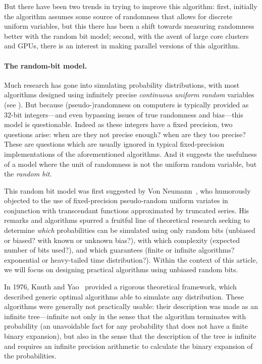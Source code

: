 \documentclass[letter,11pt,en]{quick-document}
\begin{document}
But there have been two trends in trying to improve this algorithm: first,
initially the algorithm assumes some source of randomness that allows for
discrete uniform variables, but this there has been a shift towards
measuring randomness better with the random bit model; second, with the
avent of large core clusters and GPUs, there is an interest in making
parallel versions of this algorithm.

\paragraph{The random-bit model.}

Much research has gone into simulating probability distributions, with
most algorithms designed using infinitely precise \emph{continuous uniform
  random} variables (see \cite[II.3.7]{Devroye86}). But because
(pseudo-)randomness on computers is typically provided as 32-bit
integers---and even bypassing issues of true randomness and bias---this
model is questionable. Indeed as these integers have a fixed precision,
two questions arise: when are they not precise enough? when are they too
precise? These are questions which are usually ignored in typical
fixed-precision implementations of the aforementioned algorithms. And it
suggests the usefulness of a model where the unit of randomness is not the
uniform random variable, but the \emph{random bit}.

This random bit model was first suggested by Von Neumann~\cite{Neumann51},
who humorously objected to the use of fixed-precision pseudo-random
uniform variates in conjunction with transcendant functions approximated
by truncated series. His remarks and algorithms spurred a fruitful line of
theoretical research seeking to determine \emph{which} probabilities can
be simulated using only random bits (unbiased or biased? with known or
unknown bias?), with which complexity (expected number of bits used?), and
which guarantees (finite or infinite algorithms? exponential or
heavy-tailed time distribution?). Within the context of this article, we
will focus on designing practical algorithms using unbiased random bits.

In 1976, Knuth and Yao~\cite{KnYa76} provided a rigorous theoretical
framework, which described generic optimal algorithms able to simulate any
distribution. These algorithms were generally not practically usable:
their description was made as an infinite tree---infinite not only in the
sense that the algorithm terminates with probability  (an unavoidable
fact for any probability that does not have a finite binary expansion),
but also in the sense that the description of the tree is infinite and
requires an infinite precision arithmetic to calculate the binary
expansion of the probabilities.
\end{document}
